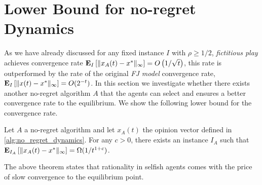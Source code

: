 \section{Lower Bound for no-regret Dynamics}\label{s:lower_bound}

As we have already discussed for any fixed instance $I$ with
$\rho\geq 1/2$, \emph{fictitious play} achieves convergence rate
$\bm{\mathrm{E}}_{I} \left[ \| x_A(t)-x^* \|_{\infty} \right]=O\left(1/\sqrt{t}\right)$,
this rate is outperformed by the rate of the original \emph{FJ model}
convergence rate, $\bm{\mathrm{E}}_{I} \left[ \| x(t)-x^* \|_{\infty} \right]=O(2^{-t})$.
In this section we investigate whether there exists another no-regret
algorithm $A$ that the agents can select and ensures a better convergence rate
to the equilibrium.
We show the following lower bound for the convergence rate.
\begin{theorem}\label{t:dynamics_lower_bound}
  Let $A$ a no-regret algorithm and let $x_A(t)$ the
  opinion vector defined in \ref{alg:no_regret_dynamics}.
  For any $c>0$, there exists an instance $I_A$ such that
  $\bm{\mathrm{E}}_{I_A} \left[ \| x_A(t)-x^* \|_{\infty} \right] = \Omega(1/t^{1+c})$.
\end{theorem}
The above theorem states that rationality in selfish agents comes
with the price of slow convergence to the equilibrium point.


